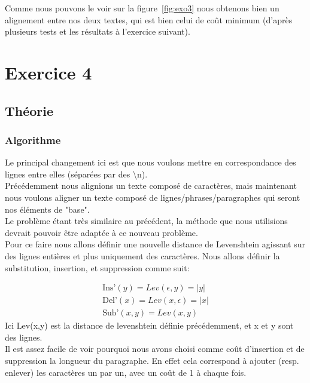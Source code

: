 \documentclass{article}
\begin{document}
Comme nous pouvons le voir sur la figure~\ref{fig:exo3} nous obtenons bien un
alignement entre nos deux textes, qui est bien celui de coût minimum (d'après
plusieurs tests et les résultats à l'exercice suivant).
\section{Exercice 4}
\subsection{Théorie}
\subsubsection{Algorithme}
Le principal changement ici est que nous voulons mettre en correspondance des
lignes entre elles (séparées par des \textbackslash{}n).\\
Précédemment nous alignions un texte composé de caractères, mais maintenant nous
voulons aligner un texte composé de lignes/phrases/paragraphes qui seront nos
éléments de "base".\\

Le problème étant très similaire au précédent, la méthode que nous utilisions
devrait pouvoir être adaptée à ce nouveau problème.\\
Pour ce faire nous allons définir une nouvelle distance de Levenshtein agissant sur
des lignes entières et plus uniquement des caractères.
Nous allons définir la substitution, insertion, et suppression comme suit:

\begin{gather*}
	\text{Ins'}(y) = Lev(\epsilon,y) = \lvert y \rvert\\
	\text{Del'}(x) = Lev(x,\epsilon) = \lvert x \rvert\\
	\text{Sub'}(x,y) = Lev(x,y)
\end{gather*}
Ici Lev(x,y) est la distance de levenshtein définie précédemment, et x et y
sont des lignes.\\

Il est assez facile de voir pourquoi nous avons choisi comme coût d'insertion
et de suppression la longueur du paragraphe. En effet cela correspond à ajouter
(resp. enlever) les caractères un par un, avec un coût de 1 à chaque fois.\\
\end{document}
